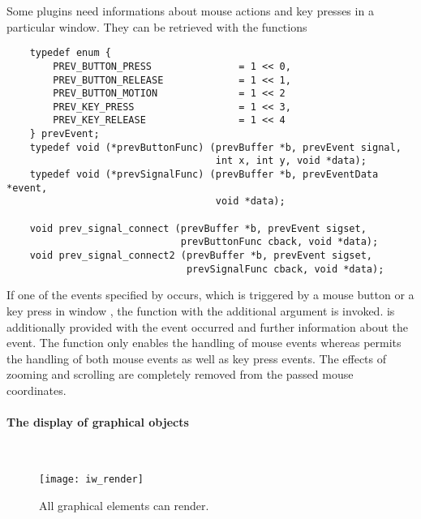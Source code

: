Some plugins need informations about mouse actions and key presses
in a particular window. They can be retrieved with the functions
\begin{small}
\linespread{0.9}
\begin{verbatim}
    typedef enum {
        PREV_BUTTON_PRESS               = 1 << 0,
        PREV_BUTTON_RELEASE             = 1 << 1,
        PREV_BUTTON_MOTION              = 1 << 2
        PREV_KEY_PRESS                  = 1 << 3,
        PREV_KEY_RELEASE                = 1 << 4
    } prevEvent;
    typedef void (*prevButtonFunc) (prevBuffer *b, prevEvent signal,
                                    int x, int y, void *data);
    typedef void (*prevSignalFunc) (prevBuffer *b, prevEventData *event,
                                    void *data);

    void prev_signal_connect (prevBuffer *b, prevEvent sigset,
                              prevButtonFunc cback, void *data);
    void prev_signal_connect2 (prevBuffer *b, prevEvent sigset,
                               prevSignalFunc cback, void *data);
\end{verbatim}
\end{small}
If one of the events specified by  occurs, which is
triggered by a mouse button or a key press in window , the
function  with the additional argument  is
invoked.  is additionally provided with the event
occurred and further information about the event. The function
 only enables the handling of mouse
events whereas  permits the handling
of both mouse events as well as key press events. The effects of
zooming and scrolling are completely removed from the passed mouse
coordinates.

\paragraph{The display of graphical objects}\hfill\\

\begin{figure}[htb]
  \begin{center}
    \texttt{[image: iw\_render]}
  \end{center}
  \caption[\icewing{}'s graphical elements]
  {All graphical elements \icewing{} can render.}
  \label{fig:p_render}
\end{figure}

